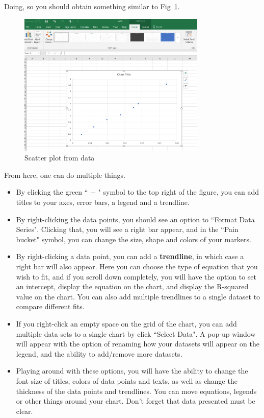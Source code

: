 \documentclass[12pt]{report}
\begin{document}
\begin{appendix}
Doing, so you should obtain something similar to Fig~\ref{Fig:Excel-fig}.
\begin{figure}[h]
\centering
\includegraphics[width=0.8\textwidth]{Excel-fig}
\caption{Scatter plot from data}
\label{Fig:Excel-fig}
\end{figure}
From here, one can do multiple things. 
\begin{itemize}
\item By clicking the green `` + " symbol to the top right of the figure, you can add titles to your axes, error bars, a legend and a trendline.
\item By right-clicking the data points, you should see an option to ``Format Data Series". Clicking that, you will see a right bar appear, and in the ``Pain bucket" symbol, you can change the size, shape and colors of your markers.
\item By right-clicking a data point, you can add a \textbf{trendline}, in which case a right bar will also appear. Here you can choose the type of equation that you wish to fit, and if you scroll down completely, you will have the option to set an intercept, display the equation on the chart, and display the R-squared value on the chart. You can also add multiple trendlines to a single dataset to compare different fits.
\item If you right-click an empty space on the grid of the chart, you can add multiple data sets to a single chart by click ``Select Data". A pop-up window will appear with the option of renaming how your datasets will appear on the legend, and the ability to add/remove more datasets.
\item Playing around with these options, you will have the ability to change the font size of titles, colors of data points and texts, as well as change the thickness of the data points and trendlines. You can move equations, legends or other things around your chart. Don't forget that data presented must be clear.
\end{itemize}


\end{appendix}
\end{document}

